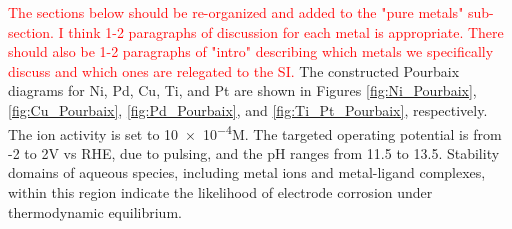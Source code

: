 \textcolor{red}{The sections below should be re-organized and added to the "pure metals" sub-section. I think 1-2 paragraphs of discussion for each metal is appropriate. There should also be 1-2 paragraphs of "intro" describing which metals we specifically discuss and which ones are relegated to the SI.}
The constructed Pourbaix diagrams for Ni, Pd, Cu, Ti, and Pt are shown in Figures \ref{fig:Ni_Pourbaix}, \ref{fig:Cu_Pourbaix}, \ref{fig:Pd_Pourbaix}, and \ref{fig:Ti_Pt_Pourbaix}, respectively. The ion activity is set to \num{10e-4}M. The targeted operating potential is from -2 to 2V vs RHE, due to pulsing, and the pH ranges from 11.5 to 13.5. Stability domains of aqueous species, including metal ions and metal-ligand complexes, within this region indicate the likelihood of electrode corrosion under thermodynamic equilibrium. 




